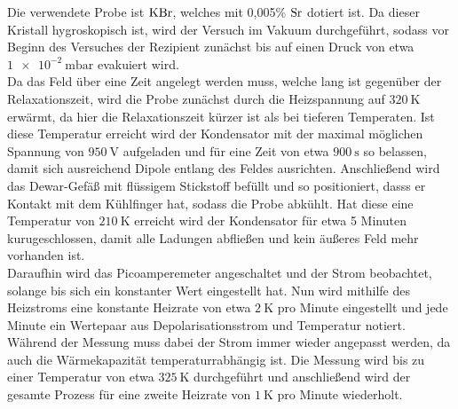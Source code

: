 Die verwendete Probe ist $\ce{KBr}$, welches mit 0,005\% $\ce{Sr}$ dotiert ist.
Da dieser Kristall hygroskopisch ist, wird der Versuch im Vakuum durchgeführt, sodass vor Beginn des
Versuches der Rezipient zunächst bis auf einen Druck von etwa $\SI{1e-2}{\milli\bar}$
evakuiert wird. \\
Da das Feld über eine Zeit angelegt werden muss, welche lang ist gegenüber der Relaxationszeit,
wird die Probe zunächst durch die Heizspannung auf $\SI{320}{\kelvin}$ erwärmt, da hier die Relaxationszeit
kürzer ist als bei tieferen Temperaten. Ist diese Temperatur erreicht wird der Kondensator
mit der maximal möglichen Spannung von $\SI{950}{\volt}$ aufgeladen und für eine Zeit von
etwa $\SI{900}{\second}$ so belassen, damit sich ausreichend Dipole entlang des Feldes ausrichten.
Anschließend wird das Dewar-Gefäß mit flüssigem Stickstoff befüllt und so positioniert,
dasss er Kontakt mit dem Kühlfinger hat, sodass die Probe abkühlt. Hat diese eine Temperatur
von $\SI{210}{\kelvin}$ erreicht wird der Kondensator für etwa 5 Minuten kurugeschlossen, damit alle
Ladungen abfließen und kein äußeres Feld mehr vorhanden ist. \\
Daraufhin wird das Picoamperemeter angeschaltet und der Strom beobachtet, solange bis sich ein
konstanter Wert eingestellt hat. Nun wird mithilfe des Heizstroms eine konstante Heizrate von etwa
$\SI{2}{\kelvin}$ pro Minute eingestellt und jede Minute ein Wertepaar aus Depolarisationsstrom
und Temperatur notiert. Während der Messung muss dabei der Strom immer wieder angepasst werden,
da auch die Wärmekapazität temperaturrabhängig ist. Die Messung wird bis zu einer Temperatur von etwa
$\SI{325}{\kelvin}$ durchgeführt und anschließend wird der gesamte Prozess für eine
zweite Heizrate von $\SI{1}{\kelvin}$ pro Minute wiederholt.
